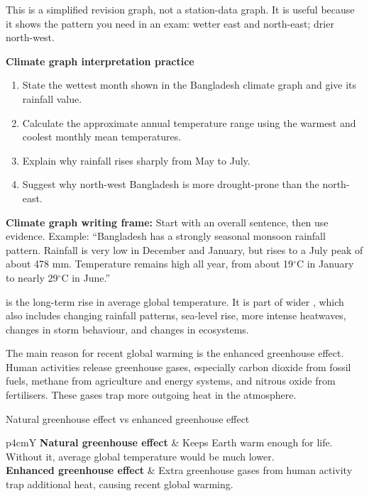 \documentclass[11pt,a4paper]{article}
\begin{document}
This is a simplified revision graph, not a station-data graph. It is useful because it shows the pattern you need in an exam: wetter east and north-east; drier north-west.

\begin{examcheck}
\textbf{Climate graph interpretation practice}
\begin{enumerate}
  \item State the wettest month shown in the Bangladesh climate graph and give its rainfall value.
  \item Calculate the approximate annual temperature range using the warmest and coolest monthly mean temperatures.
  \item Explain why rainfall rises sharply from May to July.
  \item Suggest why north-west Bangladesh is more drought-prone than the north-east.
\end{enumerate}
\end{examcheck}

\begin{skillbox}
\textbf{Climate graph writing frame:} Start with an overall sentence, then use evidence. Example: ``Bangladesh has a strongly seasonal monsoon rainfall pattern. Rainfall is very low in December and January, but rises to a July peak of about 478 mm. Temperature remains high all year, from about 19$^\circ$C in January to nearly 29$^\circ$C in June.''
\end{skillbox}

\newpage
{}

 is the long-term rise in average global temperature. It is part of wider , which also includes changing rainfall patterns, sea-level rise, more intense heatwaves, changes in storm behaviour, and changes in ecosystems.

The main reason for recent global warming is the enhanced greenhouse effect. Human activities release greenhouse gases, especially carbon dioxide from fossil fuels, methane from agriculture and energy systems, and nitrous oxide from fertilisers. These gases trap more outgoing heat in the atmosphere.

\begin{keybox}{Natural greenhouse effect vs enhanced greenhouse effect}
\begin{tabularx}{\textwidth}{p{4cm}Y}
\toprule
\textbf{Natural greenhouse effect} & Keeps Earth warm enough for life. Without it, average global temperature would be much lower.\\
\textbf{Enhanced greenhouse effect} & Extra greenhouse gases from human activity trap additional heat, causing recent global warming.\\
\bottomrule
\end{tabularx}
\end{keybox}
\end{document}
